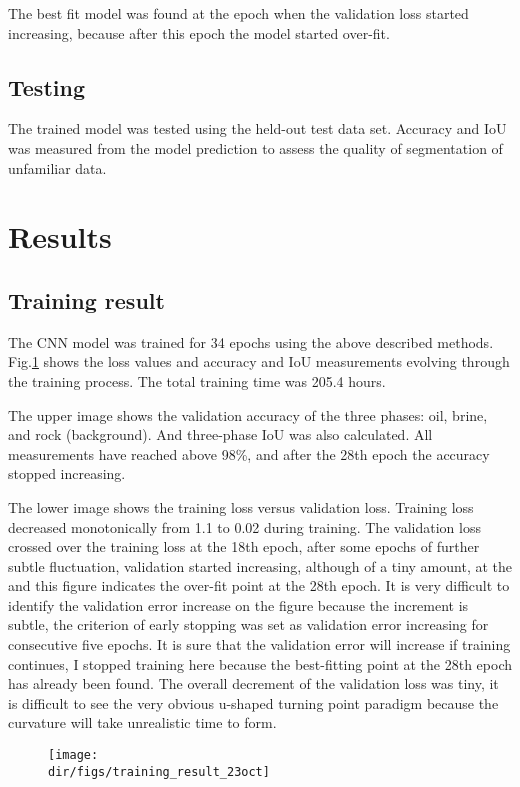 The best fit model was found at the epoch when the validation loss started increasing, because after this epoch the model started over-fit.

\subsection{Testing}
The trained model was tested using the held-out test data set. Accuracy and IoU was measured from the model prediction to assess the quality of segmentation of unfamiliar data.

\section{Results}
\subsection{Training result}
The CNN model was trained for 34 epochs using the above described methods. Fig.\ref{training_result} shows the loss values and accuracy and IoU measurements evolving through the training process. The total training time was 205.4 hours. 

The upper image shows the validation accuracy of the three phases: oil, brine, and rock (background). And three-phase IoU was also calculated. All measurements have reached above 98\%, and after the 28th epoch the accuracy stopped increasing.

The lower image shows the training loss versus validation loss. Training loss decreased monotonically from 1.1 to 0.02 during training. The validation loss crossed over the training loss at the 18th epoch, after some epochs of further subtle fluctuation, validation started increasing, although of a tiny amount, at the and this figure indicates the over-fit point at the 28th epoch. It is very difficult to identify the validation error increase on the figure because the increment is subtle, the criterion of early stopping was set as validation error increasing for consecutive five epochs. It is sure that the validation error will increase if training continues, I stopped training here because the best-fitting point at the 28th epoch has already been found. The overall decrement of the validation loss was tiny, it is difficult to see the very obvious u-shaped turning point paradigm because the curvature will take unrealistic time to form.

\begin{figure}[htbp]
  \centering
  \texttt{[image: \\dir/figs/training\_result\_23oct]}
  \caption{}
  \label{training_result}
\end{figure}

